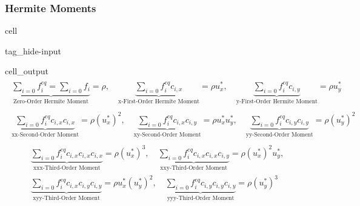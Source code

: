 \documentclass[letterpaper,10pt,english,openany,oneside]{jupyterBook}
\begin{document}
\subsubsection{Hermite Moments}
\label{\detokenize{Refs/LBM-Study/intro-nse-lbm/Navier-Stokes-Equation:id4}}
\begin{sphinxuseclass}{cell}
\begin{sphinxuseclass}{tag_hide-input}\begin{sphinxVerbatimOutput}

\begin{sphinxuseclass}{cell_output}\begin{equation*}
\begin{split}\displaystyle \begin{gathered}\underbrace{\sum_{i=0} f_{i}^{eq} =\sum_{i=0} f_{i} }_{\textrm{Zero-Order Hermite Moment}} =\rho,\quad \underbrace{\sum_{i=0} f_{i}^{eq}c_{i,x} }_{\textrm{x-First-Order Hermite Moment}} =\rho u^{*}_{x},\quad \underbrace{\sum_{i=0} f_{i}^{eq}c_{i,y} }_{\textrm{y-First-Order Hermite Moment}} =\rho u^{*}_{y}\end{gathered}\end{split}
\end{equation*}\begin{equation*}
\begin{split}\displaystyle \begin{gathered}\underbrace{\sum_{i=0} f_{i}^{eq} c_{i,x}c_{i,x} }_{\textrm{xx-Second-Order Moment}} =\rho \left(u^{*}_{x}\right)^{2},\quad \underbrace{\sum_{i=0} f_{i}^{eq} c_{i,x}c_{i,y} }_{\textrm{xy-Second-Order Moment}} =\rho u^{*}_{x} u^{*}_{y},\quad \underbrace{\sum_{i=0} f_{i}^{eq} c_{i,y}c_{i,y} }_{\textrm{yy-Second-Order Moment}} =\rho \left(u^{*}_{y}\right)^{2}\end{gathered}\end{split}
\end{equation*}\begin{equation*}
\begin{split}\displaystyle \begin{gathered}\underbrace{\sum_{i=0} f_{i}^{eq} c_{i,x}c_{i,x}c_{i,x} }_{\textrm{xxx-Third-Order Moment}} =\rho \left(u^{*}_{x}\right)^{3},\quad \underbrace{\sum_{i=0} f_{i}^{eq} c_{i,x}c_{i,x}c_{i,y} }_{\textrm{xxy-Third-Order Moment}} =\rho \left(u^{*}_{x}\right)^{2} u^{*}_{y},\\[10pt]\underbrace{\sum_{i=0} f_{i}^{eq} c_{i,x}c_{i,y}c_{i,y} }_{\textrm{xyy-Third-Order Moment}} =\rho u^{*}_{x} \left(u^{*}_{y}\right)^{2},\quad \underbrace{\sum_{i=0} f_{i}^{eq} c_{i,y}c_{i,y}c_{i,y} }_{\textrm{yyy-Third-Order Moment}} =\rho \left(u^{*}_{y}\right)^{3}\end{gathered}\end{split}
\end{equation*}
\end{sphinxuseclass}\end{sphinxVerbatimOutput}

\end{sphinxuseclass}
\end{sphinxuseclass}
\end{document}
